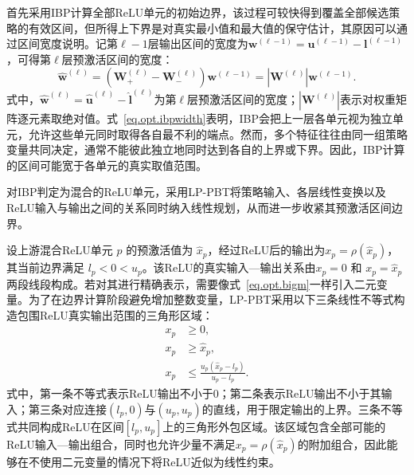 首先采用IBP计算全部ReLU单元的初始边界，该过程可较快得到覆盖全部候选策略的有效区间，但所得上下界是对真实最小值和最大值的保守估计，其原因可以通过区间宽度说明。记第$\ell-1$层输出区间的宽度为$\bm w^{(\ell-1)}=\bm u^{(\ell-1)}-\bm l^{(\ell-1)}$，可得第$\ell$层预激活区间的宽度：
\begin{equation}
\hat{\bm w}^{(\ell)}
=\left(
\bm W_{+}^{(\ell)}-\bm W_{-}^{(\ell)}
\right)\bm w^{(\ell-1)}
=\left|\bm W^{(\ell)}\right|
\bm w^{(\ell-1)}.
\label{eq.opt.ibpwidth}
\end{equation}
式中，$\hat{\bm w}^{(\ell)}=\hat{\bm u}^{(\ell)}-\hat{\bm l}^{(\ell)}$为第$\ell$层预激活区间的宽度；$\left|\bm W^{(\ell)}\right|$表示对权重矩阵逐元素取绝对值。式~\eqref{eq.opt.ibpwidth}表明，IBP会把上一层各单元视为独立单元，允许这些单元同时取得各自最不利的端点。然而，多个特征往往由同一组策略变量共同决定，通常不能彼此独立地同时达到各自的上界或下界。因此，IBP计算的区间可能宽于各单元的真实取值范围。

对IBP判定为混合的ReLU单元，采用LP-PBT将策略输入、各层线性变换以及ReLU输入与输出之间的关系同时纳入线性规划，从而进一步收紧其预激活区间边界。

设上游混合ReLU单元 \(p\) 的预激活值为 \(\hat{x}_p\)，经过ReLU后的输出为\(x_p=\rho(\hat{x}_p)\)，其当前边界满足 \(l_p<0<u_p\)。该ReLU的真实输入—输出关系由\(x_p=0\) 和 \(x_p=\hat{x}_p\) 两段线段构成。若对其进行精确表示，需要像式~\eqref{eq.opt.bigm}一样引入二元变量。为了在边界计算阶段避免增加整数变量，LP-PBT采用以下三条线性不等式构造包围ReLU真实输出范围的三角形区域：
\begin{equation}
\begin{aligned}
x_p &\geq 0,\\
x_p &\geq \hat{x}_p,\\
x_p &\leq \frac{u_p(\hat{x}_p-l_p)}{u_p-l_p}.
\end{aligned}
\end{equation}
式中，第一条不等式表示ReLU输出不小于0；第二条表示ReLU输出不小于其输入；第三条对应连接\((l_p,0)\)与\((u_p,u_p)\)的直线，用于限定输出的上界。三条不等式共同构成ReLU在区间\([l_p,u_p]\)上的三角形外包区域。该区域包含全部可能的ReLU输入—输出组合，同时也允许少量不满足\(x_p=\rho(\hat{x}_p)\)的附加组合，因此能够在不使用二元变量的情况下将ReLU近似为线性约束。

